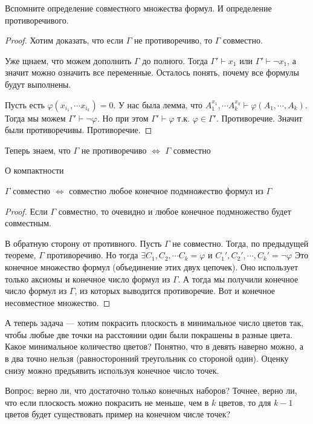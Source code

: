 Вспомните определение совместного множества формул. И определение противоречивого. 

\begin{proof}
	Хотим доказать, что если $\Gamma$ не противоречиво, то $\Gamma$ совместно.

	Уже щнаем, что можем дополнить $\Gamma$ до полного. Тогда $\Gamma' \vdash x_1$ или $\Gamma' \vdash \lnot x_1$, а значит можно означить все переменные. Осталось понять, почему все формулы будут выполнены.

	Пусть есть $\varphi(x_{i_1}, \cdots x_{i_k}) = 0$. У нас была лемма, что $A_1^{x_1}, \cdots A_k^{x_k} \vdash \varphi(A_1, \cdots,  A_k)$. Тогда мы можем $\Gamma' \vdash \lnot \varphi$. Но при этом $\Gamma' \vdash \varphi$ т.к. $\varphi \in \Gamma'$. Противоречие. Значит были противоречивы. Противоречие.
\end{proof}

Теперь знаем, что $\Gamma$ не противоречиво $\Leftrightarrow$ $\Gamma$ совместно

\begin{theorem} О компактности

	$\Gamma$ совместно $\Leftrightarrow$ совместно любое конечное подмножество формул из $\Gamma$
	
\end{theorem}
\begin{proof}
	Если $\Gamma$ совместно, то очевидно и любое конечное подмножество будет совместным.

	В обратную сторону от противного. Пусть $\Gamma$ не совместно. Тогда, по предыдущей теореме, $\Gamma$ противоречиво. Но тогда $\exists C_1, C_2, \cdots C_k = \varphi$ и $C_1', C_2', \cdots, C_k' = \lnot \varphi$
	Это конечное множество формул (объединение этих двух цепочек). Оно использует только аксиомы и конечное число формул из $\Gamma$. А тогда мы получили конечное число формул из $\Gamma$, из которых выводится противоречие. Вот и конечное несовместное множество.
\end{proof}

А теперь задача --- хотим покрасить плоскость в минимальное число цветов так, чтобы любые две точки на расстоянии один были покрашены в разные цвета. Какое минимальное количество цветов? Понятно, что в девять наверно можно, а в два точно нельзя (равносторонний треугольник со стороной один). Оценку снизу можно предъявить используя конечное число точек. 

Вопрос: верно ли, что достаточно только конечных наборов? Точнее, верно ли, что если плоскость можно покрасить не меньше, чем в $k$ цветов, то для $k-1$ цветов будет существовать пример на конечном числе точек?

